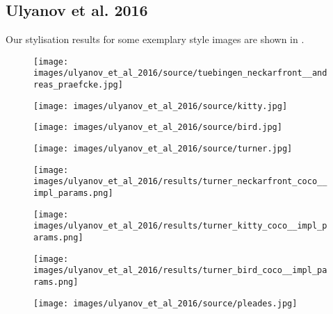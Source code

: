 \subsection{Ulyanov et al. 2016}

Our stylisation results for some exemplary style images are shown in . 

\begin{figure}[H]
	\begin{minipage}[t]{0.24\textwidth}
		\centering
		\hfill
	\end{minipage}
	\hfill%
	\begin{minipage}[t]{0.24\textwidth}
		\centering
		\texttt{[image: images/ulyanov\_et\_al\_2016/source/tuebingen\_neckarfront\_\_andreas\_praefcke.jpg]}
	\end{minipage}
	\hfill%
	\begin{minipage}[t]{0.24\textwidth}
		\centering
		\texttt{[image: images/ulyanov\_et\_al\_2016/source/kitty.jpg]}
	\end{minipage}
	\hfill%
	\begin{minipage}[t]{0.24\textwidth}
		\centering
		\texttt{[image: images/ulyanov\_et\_al\_2016/source/bird.jpg]}
	\end{minipage}
	\hfill%
	\begin{minipage}[t]{0.24\textwidth}
		\centering
		\texttt{[image: images/ulyanov\_et\_al\_2016/source/turner.jpg]}
	\end{minipage}
	\hfill%
	\begin{minipage}[t]{0.24\textwidth}
		\centering
		\texttt{[image: images/ulyanov\_et\_al\_2016/results/turner\_neckarfront\_coco\_\_impl\_params.png]}
	\end{minipage}
	\hfill%
	\begin{minipage}[t]{0.24\textwidth}
		\centering
		\texttt{[image: images/ulyanov\_et\_al\_2016/results/turner\_kitty\_coco\_\_impl\_params.png]}
	\end{minipage}
	\hfill%
	\begin{minipage}[t]{0.24\textwidth}
		\centering
		\texttt{[image: images/ulyanov\_et\_al\_2016/results/turner\_bird\_coco\_\_impl\_params.png]}
	\end{minipage}
	\hfill%
	\begin{minipage}[t]{0.24\textwidth}
		\centering
		\texttt{[image: images/ulyanov\_et\_al\_2016/source/pleades.jpg]}
	\end{minipage}

\end{figure}
